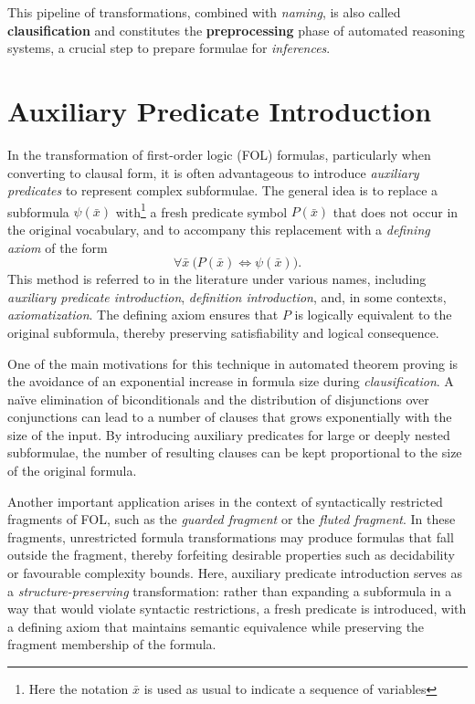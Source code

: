 This pipeline of transformations, combined with \emph{naming}, is also called \textbf{clausification} and  constitutes the \textbf{preprocessing} phase of automated reasoning systems, a crucial step to prepare formulae for \emph{inferences}.

\section{Auxiliary Predicate Introduction}

In the transformation of first-order logic (FOL) formulas, particularly when converting to clausal form, it is often advantageous to introduce \emph{auxiliary predicates} to represent complex subformulae. The general idea is to replace a subformula \(\psi(\bar{x})\) with\footnote{Here the notation \(\bar{x}\) is used as usual to indicate a sequence of variables} a fresh predicate symbol \(P(\bar{x})\) that does not occur in the original vocabulary, and to accompany this replacement with a \emph{defining axiom} of the form
\[
\forall \bar{x}\ \big(P(\bar{x}) \iff \psi(\bar{x})\big).
\]
This method is referred to in the literature under various names, including \emph{auxiliary predicate introduction}, \emph{definition introduction}, and, in some contexts, \emph{axiomatization}. The defining axiom ensures that \(P\) is logically equivalent to the original subformula, thereby preserving satisfiability and logical consequence.

One of the main motivations for this technique in automated theorem proving is the avoidance of an exponential increase in formula size during \emph{clausification}.
A naïve elimination of biconditionals and the distribution of disjunctions over conjunctions can lead to a number of clauses that grows exponentially with the size of the input.
By introducing auxiliary predicates for large or deeply nested subformulae, the number of resulting clauses can be kept proportional to the size of the original formula.

Another important application arises in the context of syntactically restricted fragments of FOL, such as the \emph{guarded fragment} or the \emph{fluted fragment}.
In these fragments, unrestricted formula transformations may produce formulas that fall outside the fragment, thereby forfeiting desirable properties such as decidability or favourable complexity bounds.
Here, auxiliary predicate introduction serves as a \emph{structure-preserving} transformation: rather than expanding a subformula in a way that would violate syntactic restrictions, a fresh predicate is introduced, with a defining axiom that maintains semantic equivalence while preserving the fragment membership of the formula.

